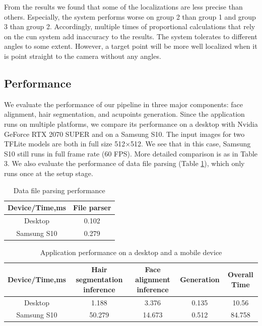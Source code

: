 From the results we found that some of the localizations are less precise than others. Especially, the system performs worse on group 2 than group 1 and group 3 than group 2. Accordingly, multiple times of proportional calculations that rely on the cun system add inaccuracy to the results. The system tolerates to different angles to some extent. However, a target point will be more well localized when it is point straight to the camera without any angles.

\subsection{Performance}
\label{sec:res-performance}
We evaluate the performance of our pipeline in three major components: face alignment, hair segmentation, and acupoints generation. Since the application runs on multiple platforms, we compare its performance on a desktop with Nvidia GeForce RTX 2070 SUPER and on a Samsung S10. The input images for two TFLite models are both in full size 512$\times$512. We see that in this case, Samsung S10 still runs in full frame rate (60 FPS). More detailed comparison is as in Table 3. We also evaluate the performance of data file parsing (Table \ref{tab:file-parse}), which only runs once at the setup stage.
\begin{table}
\caption{Data file parsing performance}
\begin{center}
\begin{tabular}{c|c}
\hline
Device/Time,ms & File parser\\
\hline
Desktop & 0.102 \\
\hline
Samsung S10 & 0.279 \\
\hline
\end{tabular}
\end{center}
\label{tab:file-parse}
\end{table}

\begin{table}
\caption{Application performance on a desktop and a mobile device}
\begin{center}
\begin{tabular}{c|c|c|c|c}
\hline
Device/Time,ms & Hair segmentation inference& Face alignment inference& Generation& Overall Time\\
\hline
Desktop &1.188& 3.376  & 0.135 &10.56\\
\hline
Samsung S10 & 50.279 & 14.673 & 0.512 &84.758 \\
\hline
\end{tabular}
\end{center}
\label{tab:time}
\end{table}
  
